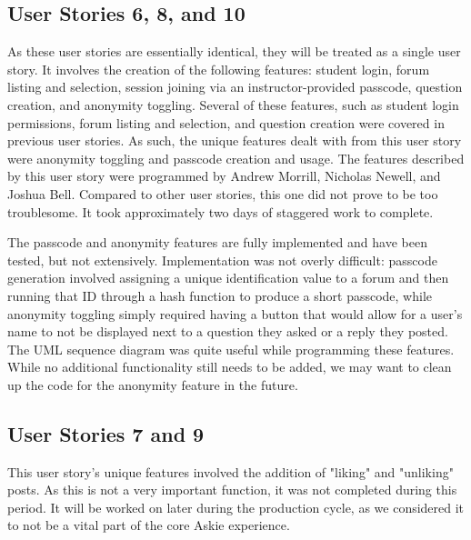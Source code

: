 \documentclass[12pt]{article}
\begin{document}
\subsection{User Stories 6, 8, and 10}
\begin{flushleft}
As these user stories are essentially identical, they will be treated as a single user story. It involves the creation of the following features: student login, forum listing and selection, session joining via an instructor-provided passcode, question creation, and anonymity toggling. Several of these features, such as student login permissions, forum listing and selection, and question creation were covered in previous user stories. As such, the unique features dealt with from this user story were anonymity toggling and passcode creation and usage. The features described by this user story were programmed by Andrew Morrill, Nicholas Newell, and Joshua Bell. Compared to other user stories, this one did not prove to be too troublesome. It took approximately two days of staggered work to complete.
\end{flushleft}

\begin{flushleft}
The passcode and anonymity features are fully implemented and have been tested, but not extensively. Implementation was not overly difficult: passcode generation involved assigning a unique identification value to a forum and then running that ID through a hash function to produce a short passcode, while anonymity toggling simply required having a button that would allow for a user's name to not be displayed next to a question they asked or a reply they posted. The UML sequence diagram was quite useful while programming these features. While no additional functionality still needs to be added, we may want to clean up the code for the anonymity feature in the future.
\end{flushleft}

\subsection{User Stories 7 and 9}

\begin{flushleft}
This user story's unique features involved the addition of "liking" and "unliking" posts. As this is not a very important function, it was not completed during this period. It will be worked on later during the production cycle, as we considered it to not be a vital part of the core Askie experience. 
\end{flushleft}
\end{document}
